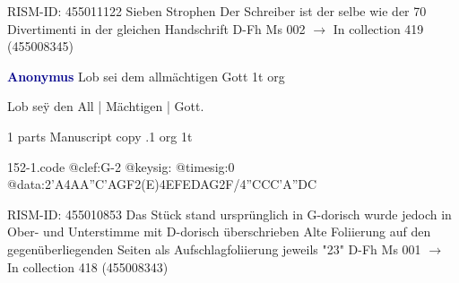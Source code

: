 \documentclass[twocolumn]{book}
\begin{document}
\newline RISM-ID: 455011122
\newline Sieben Strophen
\newline Der Schreiber ist der selbe wie der 70 Divertimenti in der gleichen Handschrift
\newline D-Fh  Ms 002
\newline $\rightarrow$ In collection 419 (455008345)

\newline \par \vspace{7pt} \textcolor{darkblue}{\textbf{Anonymus  }}
\newline Lob sei dem allmächtigen Gott  1t  
\newline org
\newline \begin{itshape}[f.23r, at left:] Lob seÿ den All | Mächtigen | Gott.\end{itshape} 
\newline \textcolor{darkblue}{}  1 parts  
\newline Manuscript copy
.1  org  1t  
\begin{filecontents*}{152-1.code}
@clef:G-2
@keysig:
@timesig:0
@data:2'A4AA''C'AGF2(E)4EFEDAG2F/4''CCC'A''DC
\end{filecontents*}
\newline
%

\newline RISM-ID: 455010853
\newline Das Stück stand ursprünglich in G-dorisch wurde jedoch in Ober- und Unterstimme mit D-dorisch überschrieben
\newline Alte Foliierung auf den gegenüberliegenden Seiten als Aufschlagfoliierung jeweils "23"
\newline D-Fh  Ms 001
\newline $\rightarrow$ In collection 418 (455008343)
\end{document}
